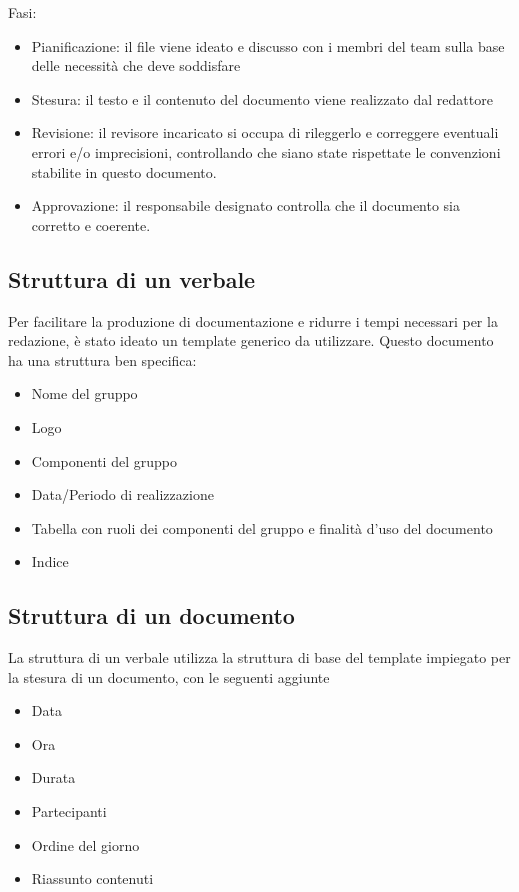 \documentclass[12pt]{article}
\begin{document}
Fasi:
\begin{itemize}
    \item Pianificazione: il file viene ideato e discusso con i membri del team sulla base delle necessità che deve soddisfare
    \item Stesura: il testo e il contenuto del documento viene realizzato dal redattore
    \item Revisione: il revisore incaricato si occupa di rileggerlo e correggere eventuali errori e/o imprecisioni, controllando che siano state rispettate le convenzioni stabilite in questo documento.
    \item Approvazione: il responsabile designato controlla che il documento sia corretto e coerente.
\end{itemize}
\subsection{Struttura di un verbale}


Per facilitare la produzione di documentazione e ridurre i tempi necessari per la redazione, è stato ideato un template generico da utilizzare.
Questo documento ha una struttura ben specifica:
\begin{itemize}
    \item Nome del gruppo
    \item Logo 
    \item Componenti del gruppo
    \item Data/Periodo di realizzazione
    \item Tabella con ruoli dei componenti del gruppo e finalità d'uso del documento
    \item Indice
\end{itemize}
\subsection{Struttura di un documento}
La struttura di un verbale utilizza la struttura di base del template impiegato per la stesura di un documento, con le seguenti aggiunte
\begin{itemize}
    \item Data
    \item Ora
    \item Durata
    \item Partecipanti
    \item Ordine del giorno
    \item Riassunto contenuti
\end{itemize}
\end{document}
